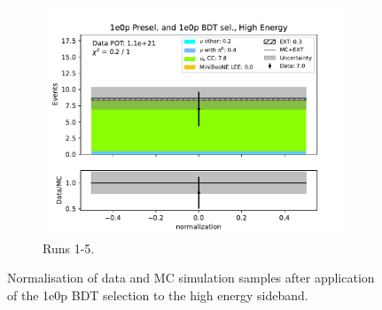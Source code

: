 \begin{figure}[H]
\begin{subfigure}{0.33\linewidth}
        \includegraphics[width=\linewidth]{technote/Sidebands/Figures/FarSideband/far_sideband_dummy_run1234b4c4d5_ZP_ZPBDT_HIGH_ENERGY.pdf}
    \caption{Runs 1-5.}
    \end{subfigure}
    \caption{Normalisation of data and MC simulation samples after application of the 1e0p BDT selection to the high energy sideband.}
\end{figure}